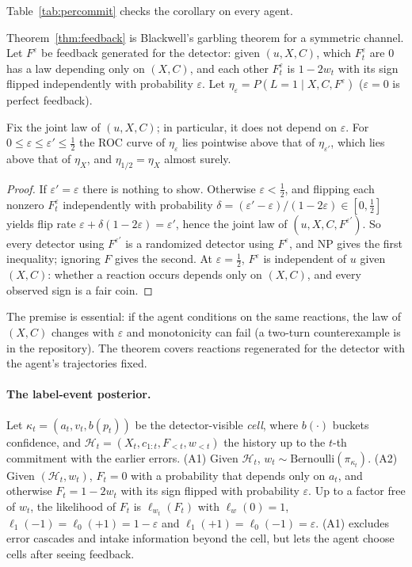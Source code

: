 \noindent Table~\ref{tab:percommit} checks the corollary on every agent.

Theorem~\ref{thm:feedback} is Blackwell's garbling theorem
\citep{blackwell1953equivalent} for a symmetric channel. Let $F^\varepsilon$
be feedback generated for the detector: given $(u,X,C)$, which
$F^\varepsilon_t$ are $0$ has a law depending only on $(X,C)$, and each other
$F^\varepsilon_t$ is $1-2w_t$ with its sign flipped independently with
probability $\varepsilon$. Let $\eta_\varepsilon=P(L=1\mid X,C,F^\varepsilon)$
($\varepsilon=0$ is perfect feedback).

\begin{theorem}
\label{thm:feedback}
Fix the joint law of $(u,X,C)$; in particular, it does not depend on
$\varepsilon$. For $0\le\varepsilon\le\varepsilon'\le\tfrac12$ the ROC curve
of $\eta_\varepsilon$ lies pointwise above that of $\eta_{\varepsilon'}$,
which lies above that of $\eta_X$, and
$\eta_{1/2}=\eta_X$ almost surely.
\end{theorem}
\begin{proof}
If $\varepsilon'=\varepsilon$ there is nothing to show. Otherwise
$\varepsilon<\tfrac12$, and flipping each nonzero $F^{\varepsilon}_t$
independently with probability
$\delta=(\varepsilon'-\varepsilon)/(1-2\varepsilon)\in[0,\tfrac12]$ yields
flip rate $\varepsilon+\delta(1-2\varepsilon)=\varepsilon'$, hence the joint
law of $(u,X,C,F^{\varepsilon'})$. So every detector using $F^{\varepsilon'}$
is a randomized detector using $F^{\varepsilon}$, and NP gives the first
inequality; ignoring $F$ gives the second. At $\varepsilon=\tfrac12$,
$F^\varepsilon$ is independent of $u$ given $(X,C)$: whether a reaction
occurs depends only on $(X,C)$, and every observed sign is a fair coin.
\end{proof}

\noindent The premise is essential: if the agent conditions on the same
reactions, the law of $(X,C)$ changes with $\varepsilon$ and monotonicity can
fail (a two-turn counterexample is in the repository). The theorem covers
reactions regenerated for the detector with the agent's trajectories fixed.

\paragraph{The label-event posterior.}
Let $\kappa_t=(a_t,v_t,b(p_t))$ be the detector-visible \emph{cell}, where
$b(\cdot)$ buckets confidence, and $\mathcal{H}_t=(X_t,c_{1:t},F_{<t},w_{<t})$
the history up to the $t$-th commitment with the earlier errors. (A1) Given
$\mathcal{H}_t$, $w_t\sim\mathrm{Bernoulli}(\pi_{\kappa_t})$. (A2) Given
$(\mathcal{H}_t,w_t)$, $F_t=0$ with a probability that depends only on $a_t$,
and otherwise $F_t=1-2w_t$ with its sign flipped with probability
$\varepsilon$. Up to a factor free of $w_t$, the likelihood of $F_t$ is
$\ell_{w_t}(F_t)$ with $\ell_w(0)=1$, $\ell_1(-1)=\ell_0(+1)=1-\varepsilon$
and $\ell_1(+1)=\ell_0(-1)=\varepsilon$. (A1) excludes error cascades and
intake information beyond the cell, but lets the agent choose cells after
seeing feedback.

